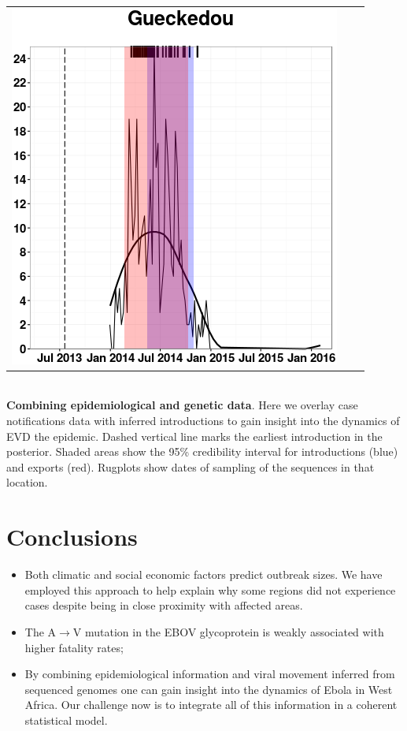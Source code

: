\documentclass[portrait,a0paper,fontscale=0.3085]{baposter}
\begin{document}
\begin{poster}
{\begin{tabular}{ccc}
 \includegraphics[scale=0.34,valign=c]{images/maxCases_Gueckedou.png}
\end{tabular}\\

\textbf{Combining epidemiological and genetic data}.
Here we overlay case notifications data with inferred introductions to gain insight into the dynamics of EVD the epidemic.
Dashed vertical line marks the earliest introduction in the posterior.
Shaded areas show the 95\% credibility interval for introductions (blue) and exports (red).
Rugplots show dates of sampling of the sequences in that location.
\section*{Conclusions}
\begin{itemize}
 \item Both climatic and social economic factors predict outbreak sizes.
 We have employed this approach to help explain why some regions did not experience cases despite being in close proximity with affected areas.
 \item The A$\rightarrow$V mutation in the EBOV glycoprotein is weakly associated with higher fatality rates;
 \item By combining epidemiological information and viral movement inferred from sequenced genomes one can gain insight into the dynamics of Ebola in West Africa.
 Our challenge now is to integrate all of this information in a coherent statistical model.
\end{itemize}

}
\end{poster}
\end{document}

